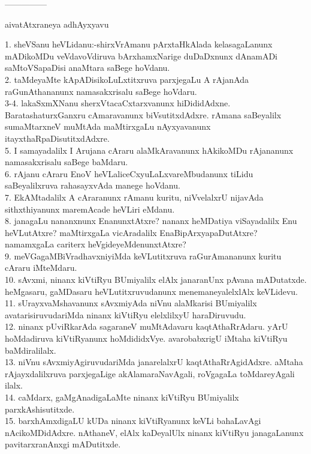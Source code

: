 \documentclass{article}
\begin{document}
\begin{center}
---------------
\end{center}

\begin{center}
aivatAtxraneya adhAyxyavu
\end{center}

1. sheVSanu heVLidanu:-shirxVrAmanu pArxtaHkAlada kelasagaLanunx mADikoMDu veVdavoVdiruva bArxhamxNarige duDaDxnunx dAnamADi saMtoVSapaDisi anaMtara saBege hoVdanu.\\
2. taMdeyaMte kApADisikoLuLxtitxruva parxjegaLu A rAjanAda raGunAthananunx namasakxrisalu saBege hoVdaru.\\
3-4. lakaSxmXNanu sherxVtacaCxtarxvanunx hiDididAdxne. BaratashaturxGanxru cAmaravanunx biVsutitxdAdxre. rAmana saBeyalilx sumaMtarxneV muMtAda maMtirxgaLu nAyxyavanunx itayxthaRpaDisutitxdAdxre.\\
5. I samayadalilx I Arujana cAraru alaMkAravanunx hAkikoMDu rAjananunx namasakxrisalu saBege baMdaru.\\
6. rAjanu cAraru EnoV heVLaliceCxyuLaLxvareMbudanunx tiLidu saBeyalilxruva rahasayxvAda manege hoVdanu.\\
7. EkAMtadalilx A cAraranunx rAmanu kuritu, niVvelalxrU nijavAda sithxthiyanunx maremAcade heVLiri eMdanu.\\
8. janagaLu nananxnunx EnanunxtAtxre? nananx heMDatiya viSayadalilx Enu heVLutAtxre? maMtirxgaLa vicAradalilx EnaBipArxyapaDutAtxre? namamxgaLa cariterx heVgideyeMdenunxtAtxre?\\
9. meVGagaMBiVradhavxniyiMda keVLutitxruva raGurAmananunx kuritu cAraru iMteMdaru.\\
10. sAvxmi, ninanx kiVtiRyu BUmiyalilx elAlx janaranUnx pAvana mADutatxde. heMgasaru, gaMDasaru heVLutitxruvudanunx menemaneyalelxlAlx keVLidevu.\\
11. sUrayxvaMshavanunx sAvxmiyAda niVnu alaMkarisi BUmiyalilx avatarisiruvudariMda ninanx kiVtiRyu elelxlilxyU haraDiruvudu.\\
12. ninanx pUviRkarAda sagaraneV muMtAdavaru kaqtAthaRrAdaru. yArU hoMdadiruva kiVtiRyanunx hoMdididxVye. avarobabxrigU iMtaha kiVtiRyu baMdiralilalx.\\
13. niVnu sAvxmiyAgiruvudariMda janarelalxrU kaqtAthaRrAgidAdxre. aMtaha rAjayxdalilxruva parxjegaLige akAlamaraNavAgali, roVgagaLa toMdareyAgali ilalx.\\
14. caMdarx, gaMgAnadigaLaMte ninanx kiVtiRyu BUmiyalilx parxkAshisutitxde.\\
15. barxhAmxdigaLU kUDa ninanx kiVtiRyanunx keVLi bahaLavAgi nAcikoMDidAdxre. nAthaneV, elAlx kaDeyalUlx ninanx kiVtiRyu janagaLanunx pavitarxranAnxgi mADutitxde.\\
\end{document}

